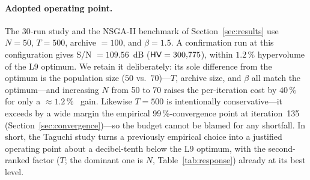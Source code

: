 \paragraph{Adopted operating point.}
The 30-run study and the NSGA-II benchmark of Section~\ref{sec:results} use $N=50$, $T=500$, archive $=100$, and $\beta=1.5$. A confirmation run at this configuration gives S/N $=109.56$~dB ($\textsf{HV} = 300{,}775$), within $1.2\,\%$ hypervolume of the L9 optimum. We retain it deliberately: its sole difference from the optimum is the population size ($50$ vs.\ $70$)---$T$, archive size, and $\beta$ all match the optimum---and increasing $N$ from 50 to 70 raises the per-iteration cost by $40\,\%$ for only a ${\approx}1.2\,\%$ \HV\ gain. Likewise $T=500$ is intentionally conservative---it exceeds by a wide margin the empirical 99\,\%-convergence point at iteration~135 (Section~\ref{sec:convergence})---so the budget cannot be blamed for any shortfall. In short, the Taguchi study turns a previously empirical choice into a justified operating point about a decibel-tenth below the L9 optimum, with the second-ranked factor ($T$; the dominant one is $N$, Table~\ref{tab:response}) already at its best level.
